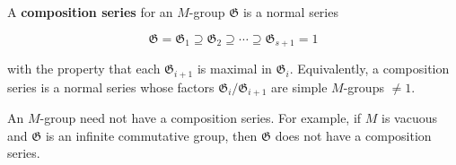 A \textbf{composition series} for an $M$-group $\mathfrak{G}$ is a normal series

$$\mathfrak{G} = \mathfrak{G}_1 \supseteq \mathfrak{G}_2 \supseteq \cdots \supseteq \mathfrak{G}_{s+1} = 1$$

with the property that each $\mathfrak{G}_{i+1}$ is maximal in $\mathfrak{G}_i$. Equivalently, a composition series is a normal series whose factors $\mathfrak{G}_i/\mathfrak{G}_{i+1}$ are simple $M$-groups $\neq 1$.

An $M$-group need not have a composition series. For example, if $M$ is vacuous and $\mathfrak{G}$ is an infinite commutative group, then $\mathfrak{G}$ does not have a composition series.
